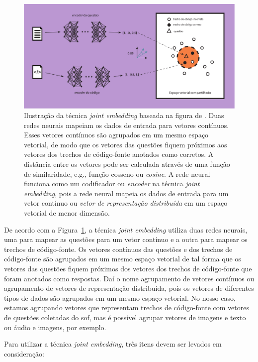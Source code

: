 \begin{figure}[H]
\centering
\includegraphics[width=1\textwidth]{figuras/cap-trabalhos-relacionados/joint_embedding.pdf}
\caption{Ilustração da técnica \textit{joint embedding} baseada na figura de \cite{cambronero-deep-learning-code-search:2019}. Duas redes neurais mapeiam os dados de entrada para vetores contínuos. Esses vetores contínuos são agrupados em um mesmo espaço vetorial, de modo que os vetores das questões fiquem próximos aos vetores dos trechos de código-fonte anotados como corretos. A distância entre os vetores pode ser calculada através de uma função de similaridade, e.g., função cosseno ou \textit{cosine}. A rede neural funciona como um codificador ou \textit{encoder} na técnica \textit{joint embedding}, pois a rede neural mapeia os dados de entrada para um vetor contínuo ou \emph{vetor de representação distribuída} em um espaço vetorial de menor dimensão.} 
\label{fig:joint-embedding}
\end{figure}

 De acordo com a Figura~\ref{fig:joint-embedding}, a técnica \textit{joint embedding} utiliza duas redes neurais, uma para mapear as questões para um vetor contínuo e a outra para mapear os trechos de código-fonte. Os vetores contínuos das questões e dos trechos de código-fonte são agrupados em um mesmo espaço vetorial de tal forma que os vetores das questões fiquem próximos dos vetores dos trechos de código-fonte que foram anotados como respostas. Daí o nome agrupamento de vetores contínuos ou agrupamento de vetores de representação distribuída, pois os vetores de diferentes tipos de dados são agrupados em um mesmo espaço vetorial. No nosso caso, estamos agrupando vetores que representam trechos de código-fonte com vetores de questões coletadas do \Gls{sof}, mas é possível agrupar vetores de imagens e texto ou áudio e imagens, por exemplo. 

Para utilizar a técnica \textit{joint embedding}, três itens devem ser levados em consideração:

